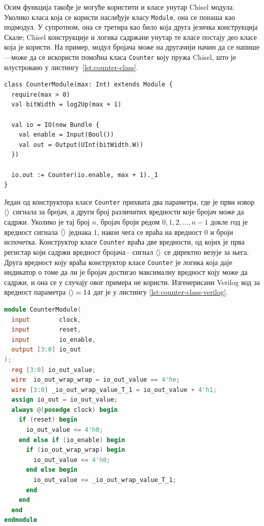 \documentclass[master]{finthesis}
\newcommand*{\correctmath}[1]{%
    \ifcsname mathCorrectionFor#1\endcsname%
        \csname mathCorrectionFor#1\endcsname%
    \else%
        #1%
    \fi%
}
\newcommand*{\mfield}[1]{{\langle\correctmath{#1}\/\rangle}}
\newcommand*{\field}[1]{\texorpdfstring{$\mfield{#1}$}{⟨#1⟩}}
\newcommand*{\prog}[1]{\texttt{#1}}
\begin{document}
Осим функција такође је могуће користити и класе унутар Chisel модула. Уколико класа која се користи наслеђује класу \prog{Module}, она се понаша као подмодул. У супротном, она се третира као било која друга језичка конструкција Скале; Chisel конструкције и логика садржане унутар те класе постају део класе која је користи. На пример, модул бројача може на другачији начин да се напише---може да се искористи помоћна класа \prog{Counter} коју пружа Chisel, што је илустровано у листингу~\ref{lst:counter-class}.

\begin{lstlisting}[style=Chisel, caption={Реализација модула бројача коришћењем Chisel-ове класе \prog{Counter}.}, label={lst:counter-class}]
class CounterModule(max: Int) extends Module {
  require(max > 0)
  val bitWidth = log2Up(max + 1)

  val io = IO(new Bundle {
    val enable = Input(Bool())
    val out = Output(UInt(bitWidth.W))
  })

  io.out := Counter(io.enable, max + 1)._1
}
\end{lstlisting}

Један од конструктора класе \prog{Counter} прихвата два параметра, где је први извор \field{enable} сигнала за бројач, а други број различитих вредности које бројач може да садржи. Уколико је тај број $n$, бројач броји редом $0, 1, 2, \dots, n-1$ докле год је вредност сигнала \field{enable} једнака $1$, након чега се враћа на вредност $0$ и броји испочетка. Конструктор класе \prog{Counter} враћа две вредности, од којих је прва регистар који садржи вредност бројача---сигнал \field{out} се директно везује за њега. Друга вредност коју враћа конструктор класе \prog{Counter} је логика која даје индикатор о томе да ли је бројач достигао максималну вредност коју може да садржи, и она се у случају овог примера не користи. Изгенерисани Verilog код за вредност параметра $\mfield{max} = 14$ дат је у листингу \ref{lst:counter-class-verilog}.

\begin{lstlisting}[language=Verilog, caption={Изгенерисан Verilog код модула бројача за вредност параметра $\mfield{max} = 14$.}, label={lst:counter-class-verilog}]
module CounterModule(
  input        clock,
  input        reset,
  input        io_enable,
  output [3:0] io_out
);
  reg [3:0] io_out_value;
  wire  io_out_wrap_wrap = io_out_value == 4'he;
  wire [3:0] _io_out_wrap_value_T_1 = io_out_value + 4'h1;
  assign io_out = io_out_value;
  always @(posedge clock) begin
    if (reset) begin
      io_out_value <= 4'h0;
    end else if (io_enable) begin
      if (io_out_wrap_wrap) begin
        io_out_value <= 4'h0;
      end else begin
        io_out_value <= _io_out_wrap_value_T_1;
      end
    end
  end
endmodule
\end{lstlisting}
\end{document}
